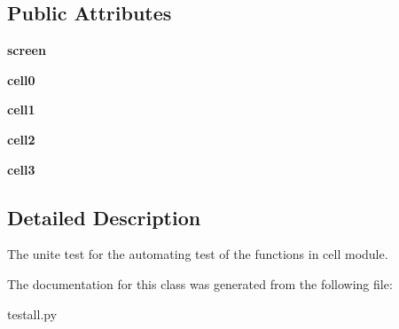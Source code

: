 \subsection*{Public Attributes}
\begin{CompactItemize}
\item 
\textbf{screen}\label{classtestall_1_1CellTest_c09b8fc176a2837bfa8a1fe694a81cad}

\item 
\textbf{cell0}\label{classtestall_1_1CellTest_cf1359307d51d013671f47761c001bfc}

\item 
\textbf{cell1}\label{classtestall_1_1CellTest_71af8b7ec4bb5c4f1caff36423ea8313}

\item 
\textbf{cell2}\label{classtestall_1_1CellTest_0ee02a7eb67488936ece9441cdf1b635}

\item 
\textbf{cell3}\label{classtestall_1_1CellTest_978d1052c45ee5b153db1e4104c0e0db}

\end{CompactItemize}


\subsection{Detailed Description}
The unite test for the automating test of the functions in cell module. 



The documentation for this class was generated from the following file:\begin{CompactItemize}
\item 
testall.py\end{CompactItemize}
